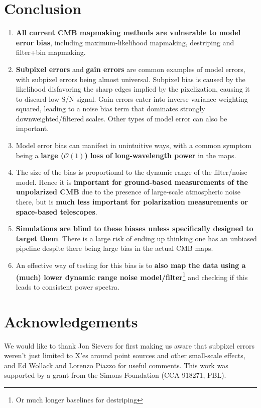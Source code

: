 \documentclass[twocolumn,apj]{aastex63}
\begin{document}
\section{Conclusion}

\begin{enumerate}
	\item \textbf{All current CMB mapmaking methods are vulnerable to model error bias},
		including maximum-likelihood mapmaking, destriping and filter+bin mapmaking.
	\item \textbf{Subpixel errors} and \textbf{gain errors} are common examples of
		model errors, with subpixel errors being almost universal.
		Subpixel bias is caused by the likelihood disfavoring the sharp edges implied by
		the pixelization, causing it to discard low-S/N signal. Gain errors enter into inverse
		variance weighting squared, leading to a noise bias term that dominates strongly downweighted/filtered scales.
		Other types of model error can also be important.
	\item Model error bias can manifest in unintuitive ways, with a common symptom
		being a \textbf{large ($\mathcal{O}(1)$) loss of long-wavelength power} in the maps.
	\item The size of the bias is proportional to the dynamic range of the filter/noise model.
		Hence it is \textbf{important for ground-based measurements of the unpolarized CMB}
		due to the presence of large-scale atmospheric noise there, but is \textbf{much less
		important for polarization measurements or space-based telescopes}.
	\item \textbf{Simulations are blind to these biases unless specifically designed to
		target them}. There is a large risk of ending up thinking one has an unbiased
		pipeline despite there being large bias in the actual CMB maps.
	\item An effective way of testing for this bias is to \textbf{also map the data using a
		(much) lower dynamic range noise model/filter}\footnote{Or much longer baselines for destriping}
		and checking if this leads to consistent power spectra.
\end{enumerate}

\section*{Acknowledgements}
We would like to thank Jon Sievers for first making us aware
that subpixel errors weren't just limited to X'es around point
sources and other small-scale effects, and Ed Wollack and Lorenzo Piazzo for useful comments.
This work was supported by a grant from the Simons Foundation (CCA 918271, PBL).
\end{document}
